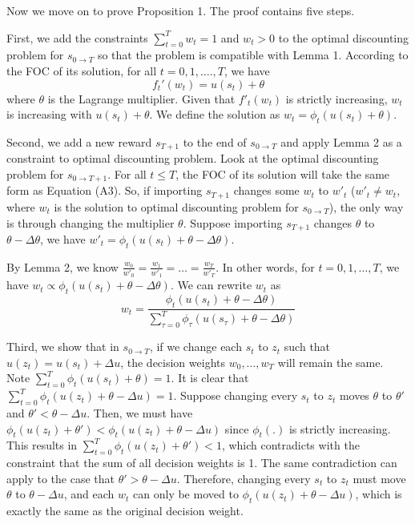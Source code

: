 \documentclass[
  12pt,
]{article}
\begin{document}
Now we move on to prove Proposition 1. The proof contains five steps.

First, we add the constraints \(\sum_{t=0}^T w_t=1\) and \(w_t>0\) to
the optimal discounting problem for \(s_{0\rightarrow T}\) so that the
problem is compatible with Lemma 1. According to the FOC of its
solution, for all \(t=0,1,….,T\), we have\[\tag{A3}
f_t'(w_t)=u(s_t)+\theta
\]where \(\theta\) is the Lagrange multiplier. Given that \(f'_t(w_t)\)
is strictly increasing, \(w_t\) is increasing with \(u(s_t)+\theta\). We
define the solution as \(w_t =\phi_t(u(s_t)+\theta)\).

Second, we add a new reward \(s_{T+1}\) to the end of
\(s_{0\rightarrow T}\) and apply Lemma 2 as a constraint to optimal
discounting problem. Look at the optimal discounting problem for
\(s_{0\rightarrow T+1}\). For all \(t\leq T\), the FOC of its solution
will take the same form as Equation (A3). So, if importing \(s_{T+1}\)
changes some \(w_t\) to \(w'_t\) (\(w'_t \neq w_t\), where \(w_t\) is
the solution to optimal discounting problem for \(s_{0\rightarrow T}\)),
the only way is through changing the multiplier \(\theta\). Suppose
importing \(s_{T+1}\) changes \(\theta\) to \(\theta-\Delta \theta\), we
have \(w'_t = \phi_t(u(s_t)+\theta-\Delta \theta)\).

By Lemma 2, we know
\(\frac{w_0}{w'_0}=\frac{w_1}{w'_1}=…=\frac{w_T}{w'_T}\). In other
words, for \(t=0,1,…,T\), we have
\(w_t \propto \phi_t(u(s_t)+\theta-\Delta \theta)\). We can rewrite
\(w_t\) as \[\tag{A4}
w_t = \frac{\phi_t(u(s_t)+\theta-\Delta \theta)}{\sum_{\tau=0}^{T}\phi_\tau(u(s_\tau)+\theta-\Delta \theta)}
\]

Third, we show that in \(s_{0\rightarrow T}\), if we change each \(s_t\)
to \(z_t\) such that \(u(z_t)=u(s_t)+\Delta u\), the decision weights
\(w_0,…,w_T\) will remain the same. Note
\(\sum_{t=0}^T \phi_t(u(s_t)+\theta)=1\). It is clear that
\(\sum_{t=0}^T \phi_t(u(z_t)+\theta-\Delta u)=1\). Suppose changing
every \(s_t\) to \(z_t\) moves \(\theta\) to \(\theta'\) and
\(\theta'<\theta-\Delta u\). Then, we must have
\(\phi_t(u(z_t)+\theta')<\phi_t(u(z_t)+\theta-\Delta u)\) since
\(\phi_t(.)\) is strictly increasing. This results in
\(\sum_{t=0}^T \phi_t(u(z_t)+\theta')<1\), which contradicts with the
constraint that the sum of all decision weights is 1. The same
contradiction can apply to the case that \(\theta'>\theta-\Delta u\).
Therefore, changing every \(s_t\) to \(z_t\) must move \(\theta\) to
\(\theta - \Delta u\), and each \(w_t\) can only be moved to
\(\phi_t(u(z_t)+\theta -\Delta u)\), which is exactly the same as the
original decision weight.
\end{document}
